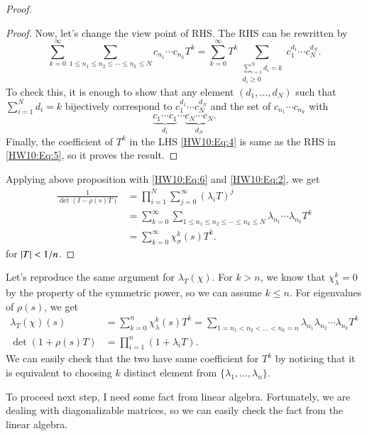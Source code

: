 \documentclass[a4paper, 12pt]{article}
\theoremstyle{Mydefinition}
\theoremstyle{Mytheorem}
\begin{document}
\begin{enumerate}
\begin{proof}
\begin{proof}
Now, let's change the view point of RHS. The RHS can be rewritten by
\begin{equation}\label{HW10:Eq:5}
    \sum_{k=0}^\infty \sum_{1\leq n_1\leq n_2\leq \cdots\leq n_k\leq N}c_{n_1}\cdots c_{n_k}T^k = \sum_{k=0}^\infty T^k\sum_{\substack{\sum_{i=1}^N d_i=k\\ d_i\geq 0}}c_1^{d_1}\cdots c_N^{d_N}.
\end{equation}
To check this, it is enough to show that any element $(d_1, \ldots, d_N)$ such that $\sum_{i=1}^N d_i = k$ bijectively correspond to $c_1^{d_1}\cdots c_N^{d_N}$ and the set of $c_{n_1}\cdots c_{n_k}$ with
\begin{equation}
    \underbrace{c_1\cdots c_1}_{d_1}\cdots \underbrace{c_{N}\cdots c_N}_{d_N}.
\end{equation}
Finally, the coefficient of $T^k$ in the LHS \eqref{HW10:Eq:4} is same as the RHS in \eqref{HW10:Eq:5}, so it proves the result.
\end{proof}
Applying above proposition with \eqref{HW10:Eq:6} and \eqref{HW10:Eq:2}, we get
\begin{equation}
\begin{split}
    \frac{1}{\det(I-\rho(s)T)} &= \prod_{i=1}^N\sum_{j=0}^\infty (\lambda_iT)^j\\
    &=\sum_{k=0}^\infty \sum_{1\leq n_1\leq n_2\leq \cdots\leq n_k\leq N}\lambda_{n_1}\cdots \lambda_{n_k}T^k\\
    &=\sum_{k=0}^\infty \chi_\sigma^k(s) T^k.
\end{split}
\end{equation}
for $\abs{T}<1/n$.
\end{proof}
Let's reproduce the same argument for $\lambda_T(\chi)$. For $k>n$, we know that $\chi_\lambda^k = 0$ by the property of the symmetric power, so we can assume $k\leq n$. For eigenvalues of $\rho(s)$, we get
\begin{equation}
    \begin{split}
        \lambda_T(\chi)(s) &= \sum_{k=0}^n \chi_\lambda^k(s) T^k = \sum_{1=n_1< n_2< \ldots < n_k=n}\lambda_{n_1}\lambda_{n_2}\cdots \lambda_{n_k} T^k\\
        \det(1+\rho(s)T) &= \prod_{i=1}^n (1+\lambda_i T).
    \end{split}
\end{equation}
We can easily check that the two have same coefficient for $T^k$ by noticing that it is equivalent to choosing $k$ distinct element from $\{\lambda_1, \ldots, \lambda_n\}$.

To proceed next step, I need some fact from linear algebra. Fortunately, we are dealing with diagonalizable matrices, so we can easily check the fact from the linear algebra.


\end{enumerate}
\end{document}
